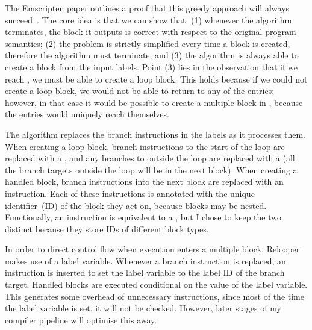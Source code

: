\documentclass[00-main.tex]{subfiles}
\begin{document}

The Emscripten paper outlines a proof that this greedy approach will always succeed~.
The core idea is that we can show that: (1) whenever the algorithm terminates, the block it outputs is correct with respect to the original program semantics; (2) the problem is strictly simplified every time a block is created, therefore the algorithm must terminate; and (3) the algorithm is always able to create a block from the input labels.
Point (3) lies in the observation that if we reach , we must be able to create a loop block.
This holds because if we could not create a loop block, we would not be able to return to any of the entries; however, in that case it would be possible to create a multiple block in , because the entries would uniquely reach themselves.

The algorithm replaces the branch instructions in the labels as it processes them.
When creating a loop block, branch instructions to the start of the loop are replaced with a , and any branches to outside the loop are replaced with a  (all the branch targets outside the loop will be in the next block).
When creating a handled block, branch instructions into the next block are replaced with an  instruction.
Each of these instructions is annotated with the unique identifier~(ID) of the block they act on, because blocks may be nested.
Functionally, an  instruction is equivalent to a , but I chose to keep the two distinct because they store IDs of different block types.

In order to direct control flow when execution enters a multiple block, Relooper makes use of a label variable.
Whenever a branch instruction is replaced, an instruction is inserted to set the label variable to the label ID of the branch target.
Handled blocks are executed conditional on the value of the label variable.
This generates some overhead of unnecessary instructions, since most of the time the label variable is set, it will not be checked.
However, later stages of my compiler pipeline will optimise this away.
\end{document}
